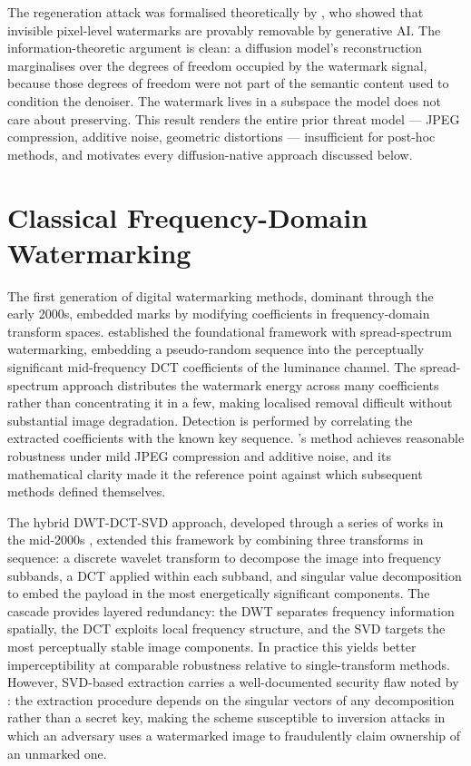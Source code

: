 ﻿\documentclass[12pt, a4paper, twoside]{report}
\numberwithin{equation}{chapter}
\begin{document}
The regeneration attack was formalised theoretically by \cite{zhao2023}, who showed that invisible pixel-level watermarks are provably removable by generative AI. The information-theoretic argument is clean: a diffusion model's reconstruction marginalises over the degrees of freedom occupied by the watermark signal, because those degrees of freedom were not part of the semantic content used to condition the denoiser. The watermark lives in a subspace the model does not care about preserving. This result renders the entire prior threat model --- JPEG compression, additive noise, geometric distortions --- insufficient for post-hoc methods, and motivates every diffusion-native approach discussed below.

\section{Classical Frequency-Domain Watermarking}

The first generation of digital watermarking methods, dominant through the early 2000s, embedded marks by modifying coefficients in frequency-domain transform spaces. \cite{cox1997} established the foundational framework with spread-spectrum watermarking, embedding a pseudo-random sequence into the perceptually significant mid-frequency DCT coefficients of the luminance channel. The spread-spectrum approach distributes the watermark energy across many coefficients rather than concentrating it in a few, making localised removal difficult without substantial image degradation. Detection is performed by correlating the extracted coefficients with the known key sequence. \cite{cox1997}'s method achieves reasonable robustness under mild JPEG compression and additive noise, and its mathematical clarity made it the reference point against which subsequent methods defined themselves.

The hybrid DWT-DCT-SVD approach, developed through a series of works in the mid-2000s \cite{cox2007book}, extended this framework by combining three transforms in sequence: a discrete wavelet transform to decompose the image into frequency subbands, a DCT applied within each subband, and singular value decomposition to embed the payload in the most energetically significant components. The cascade provides layered redundancy: the DWT separates frequency information spatially, the DCT exploits local frequency structure, and the SVD targets the most perceptually stable image components. In practice this yields better imperceptibility at comparable robustness relative to single-transform methods. However, SVD-based extraction carries a well-documented security flaw noted by \cite{cox2007book}: the extraction procedure depends on the singular vectors of any decomposition rather than a secret key, making the scheme susceptible to inversion attacks in which an adversary uses a watermarked image to fraudulently claim ownership of an unmarked one.
\end{document}
